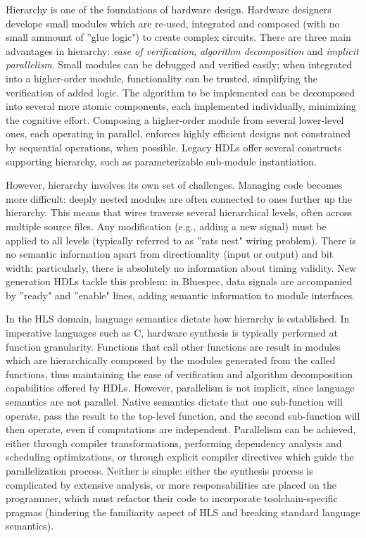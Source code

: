 Hierarchy is one of the foundations of hardware design. Hardware designers develope small modules which are re-used, integrated and composed (with no small ammount of ''glue logic") to create complex circuits. There are three main advantages in hierarchy: \textit{ease of verification}, \textit{algorithm decomposition} and \textit{implicit parallelism}. Small modules can be debugged and verified easily; when integrated into a higher-order module, functionality can be trusted, simplifying the verification of added logic. The algorithm to be implemented can be decomposed into several more atomic components, each implemented individually, minimizing the cognitive effort. Composing a higher-order module from several lower-level ones, each operating in parallel, enforces highly efficient designs not constrained by sequential operations, when possible. Legacy HDLs offer several constructs supporting hierarchy, such as parameterizable sub-module instantiation.
\par However, hierarchy involves its own set of challenges. Managing code becomes more difficult: deeply nested modules are often connected to ones further up the hierarchy. This means that wires traverse several hierarchical levels, often across multiple source files. Any modification (e.g., adding a new signal) must be applied to all levels (typically referred to as ''rats nest" wiring problem). There is no semantic information apart from directionality (input or output) and bit width: particularly, there is absolutely no information about timing validity. New generation HDLs tackle this problem: in Bluespec, data signals are accompanied by ''ready" and ''enable" lines, adding semantic information to module interfaces.
\par In the HLS domain, language semantics dictate how hierarchy is established. In imperative languages such as C, hardware synthesis is typically performed at function granularity. Functions that call other functions are result in modules which are hierarchically composed by the modules generated from the called functions, thus maintaining the ease of verification and algorithm decomposition capabilities offered by HDLs. However, parallelism is not implicit, since language semantics are not parallel. Native semantics dictate that one sub-function will operate, pass the result to the top-level function, and the second sub-function will then operate, even if computations are independent. Parallelism can be achieved, either through compiler transformations, performing dependency analysis and scheduling optimizations, or through explicit compiler directives which guide the parallelization process. Neither is simple: either the synthesis process is complicated by extensive analysis, or more responsabilities are placed on the programmer, which must refactor their code to incorporate toolchain-specific pragmas (hindering the familiarity aspect of HLS and breaking standard language semantics).
